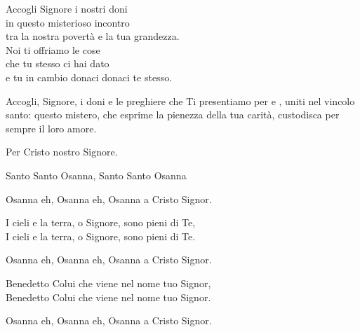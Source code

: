 \documentclass[11pt]{book}
\begin{document}
\pagebreak
\settowidth{\versewidth}{tra la nostra povertà e la tua grandezza.}
\begin{canzone}%
Accogli Signore i nostri doni\\
in questo misterioso incontro\\
tra la nostra povertà e la tua grandezza.\\
Noi ti offriamo le cose\\
che tu stesso ci hai dato\\
e tu in cambio donaci donaci te stesso.
\end{canzone}
\vspace{-\baselineskip}
Accogli, Signore, i doni e le preghiere che Ti presentiamo
per \sposa{} e \sposo, uniti nel vincolo
santo: questo mistero, che esprime la pienezza della
tua carità, custodisca per sempre il loro amore. \par\nobreak
Per Cristo nostro Signore.

\settowidth{\versewidth}{Osanna eh, Osanna eh, Osanna a Cristo Signor.}
\begin{canzone}%
Santo Santo Osanna, Santo Santo Osanna

\begin{ritornello}
Osanna eh, Osanna eh, Osanna a Cristo Signor.
\end{ritornello}

I cieli e la terra, o Signore, sono pieni di Te,\\
I cieli e la terra, o Signore, sono pieni di Te.

\begin{ritornello}
Osanna eh, Osanna eh, Osanna a Cristo Signor.
\end{ritornello}

Benedetto Colui che viene nel nome tuo Signor,\\
Benedetto Colui che viene nel nome tuo Signor.

\begin{ritornello}
Osanna eh, Osanna eh, Osanna a Cristo Signor.
\end{ritornello}
\end{canzone}
\benedizionesposi[1]
\end{document}
